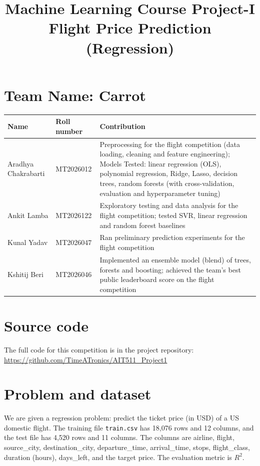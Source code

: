 \documentclass[11pt]{article}
\title{\textbf{Machine Learning Course Project-I}\\[0.3em]
       \large Flight Price Prediction (Regression)}
\date{}
\begin{document}
\maketitle

\section*{Team Name: Carrot}
\begin{center}
\small
\begin{tabular}{@{}>{\raggedright\arraybackslash}p{3.4cm}l>{\raggedright\arraybackslash}p{9.2cm}@{}}
\toprule
Name & Roll number & Contribution \\
\midrule
Aradhya Chakrabarti & MT2026012 & Preprocessing for the flight competition (data loading, cleaning and feature engineering); Models Tested: linear regression (OLS), polynomial regression, Ridge, Lasso, decision trees, random forests (with cross-validation, evaluation and hyperparameter tuning) \\
Ankit Lamba & MT2026122 & Exploratory testing and data analysis for the flight competition; tested SVR, linear regression and random forest baselines \\
Kunal Yadav & MT2026047 & Ran preliminary prediction experiments for the flight competition \\
Kshitij Beri & MT2026046 & Implemented an ensemble model (blend) of trees, forests and boosting; achieved the team's best public leaderboard score on the flight competition \\
\bottomrule
\end{tabular}
\end{center}

\section*{Source code}
The full code for this competition is in the project repository: \url{https://github.com/TimeATronics/AIT511_Project1}

\section{Problem and dataset}

We are given a regression problem: predict the ticket price (in USD) of a US domestic flight. The training file \texttt{train.csv} has 18,076 rows and 12 columns, and the test file has 4,520 rows and 11 columns. The columns are airline, flight, source\_city, destination\_city, departure\_time, arrival\_time, stops, flight\_class, duration (hours), days\_left, and the target price. The evaluation metric is $R^2$.
\end{document}
